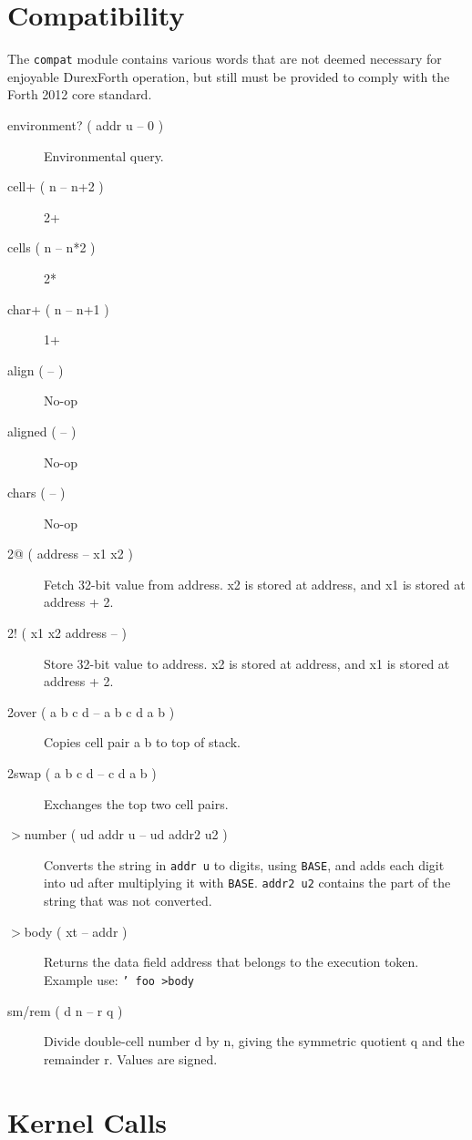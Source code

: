 \section{Compatibility}

The \texttt{compat} module contains various words that are not deemed necessary for enjoyable DurexForth operation, but still must be provided to comply with the Forth 2012 core standard.

\begin{description}
    \item[environment? ( addr u -- 0 )] Environmental query.
    \item[cell+ ( n -- n+2 )] 2+
    \item[cells ( n -- n*2 )] 2*
    \item[char+ ( n -- n+1 )] 1+
    \item[align ( -- )] No-op
    \item[aligned ( -- )] No-op
    \item[chars ( -- )] No-op
    \item[2@ ( address -- x1 x2 )] Fetch 32-bit value from address. x2 is stored at address, and x1 is stored at address + 2.
    \item[2! ( x1 x2 address -- )] Store 32-bit value to address. x2 is stored at address, and x1 is stored at address + 2.
    \item[2over ( a b c d -- a b c d a b )] Copies cell pair a b to top of stack.
    \item[2swap ( a b c d -- c d a b )] Exchanges the top two cell pairs.
    \item[$>$number ( ud addr u -- ud addr2 u2 )] Converts the string in \texttt{addr u} to digits, using \texttt{BASE}, and adds each digit into ud after multiplying it with \texttt{BASE}. \texttt{addr2 u2} contains the part of the string that was not converted.
    \item[$>$body ( xt -- addr )] Returns the data field address that belongs to the execution token. Example use: \texttt{' foo >body}
    \item[sm/rem ( d n -- r q )] Divide double-cell number d by n, giving the symmetric quotient q and the remainder r. Values are signed.

\end{description}

\section{Kernel Calls}

